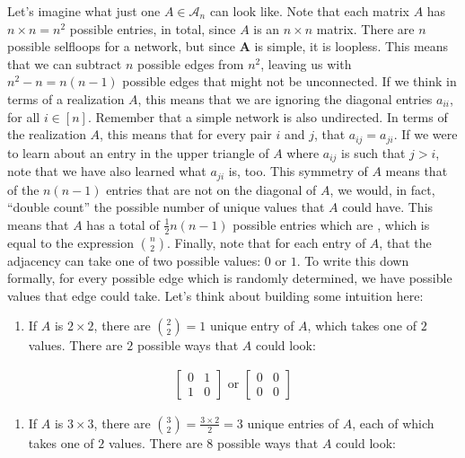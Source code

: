 \documentclass[letterpaper,10pt,english]{jupyterBook}
\begin{document}
\sphinxAtStartPar
Let’s imagine what just one \(A \in \mathcal A_n\) can look like. Note that each matrix \(A\) has \(n \times n = n^2\) possible entries, in total, since \(A\) is an \(n \times n\) matrix. There are \(n\) possible self\sphinxhyphen{}loops for a network, but since \(\mathbf A\) is simple, it is loopless. This means that we can subtract \(n\) possible edges from \(n^2\), leaving us with \(n^2 - n = n(n-1)\) possible edges that might not be unconnected. If we think in terms of a realization \(A\), this means that we are ignoring the diagonal entries \(a_{ii}\), for all \(i \in [n]\).  Remember that a simple network is also undirected. In terms of the realization \(A\), this means that for every pair \(i\) and \(j\), that \(a_{ij} = a_{ji}\). If we were to learn about an entry in the upper triangle of \(A\) where \(a_{ij}\) is such that \(j > i\), note that we have also learned what \(a_{ji}\) is, too. This symmetry of \(A\) means that of the \(n(n-1)\) entries that are not on the diagonal of \(A\), we would, in fact, “double count” the possible number of unique values that \(A\) could have. This means that \(A\) has a total of \(\frac{1}{2}n(n - 1)\) possible entries which are , which is equal to the expression \(\binom{n}{2}\). Finally, note that for each entry of \(A\), that the adjacency can take one of two possible values: \(0\) or \(1\). To write this down formally, for every possible edge which is randomly determined, we have  possible values that edge could take. Let’s think about building some intuition here:
\begin{enumerate}
%
\item {} 
\sphinxAtStartPar
If \(A\) is \(2 \times 2\), there are \(\binom{2}{2} = 1\) unique entry of \(A\), which takes one of \(2\) values. There are \(2\) possible ways that \(A\) could look:

\end{enumerate}
\begin{align*}
    \begin{bmatrix}
        0 & 1 \\
        1 & 0
    \end{bmatrix}\textrm{ or }
    \begin{bmatrix}
        0 & 0 \\
        0 & 0
    \end{bmatrix}
\end{align*}\begin{enumerate}
%
\item {} 
\sphinxAtStartPar
If \(A\) is \(3 \times 3\), there are \(\binom{3}{2} = \frac{3 \times 2}{2} = 3\) unique entries of \(A\), each of which takes one of \(2\) values. There are \(8\) possible ways that \(A\) could look:

\end{enumerate}
\end{document}
